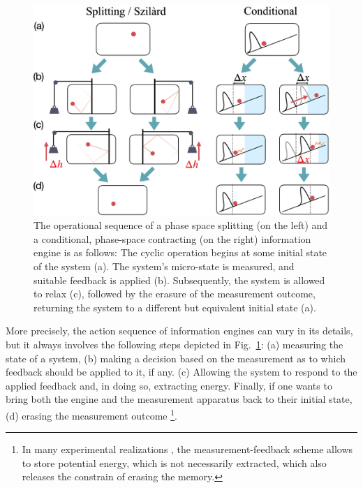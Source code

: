 \documentclass[aps, twocolumn,floatfix,showpacs, superscriptaddress]{revtex4-2}
\newcommand{\ie}{information engines }
\begin{document}
\begin{figure}
    \centering
    \includegraphics[scale = 0.17]{Schema.png}
    \caption{The operational sequence of a phase space splitting (on the left) and a conditional, phase-space contracting (on the right) information engine is as follows: The cyclic operation begins at some initial state of the system (a). The system's micro-state is measured, and suitable feedback is applied (b). Subsequently, the system is allowed to relax (c), followed by the erasure of the measurement outcome, returning the system to a different but equivalent initial state (a).}
    \label{fig:IEs_sketch}
\end{figure}

More precisely, the action sequence of \ie can vary in its details, but it always involves the following steps depicted in Fig.~\ref{fig:IEs_sketch}: (a) measuring the state of a system, (b) making a decision based on the measurement as to which feedback should be applied to it, if any. (c) Allowing the system to respond to the applied feedback and, in doing so, extracting energy. Finally, if one wants to bring both the engine and the measurement apparatus back to their initial state, (d) erasing the measurement outcome \footnote{In many experimental realizations \cite{sagawa_generalized_2010, admon_experimental_2018, saha2021maximizing}, the measurement-feedback scheme allows to store potential energy, which is not necessarily extracted, which also releases the constrain of erasing the memory.}.
\end{document}
